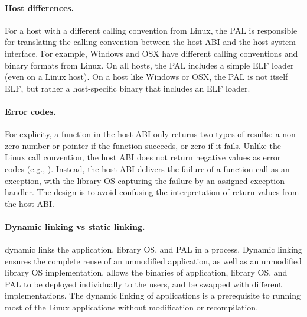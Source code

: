 



\paragraph{Host differences.}
For a host with a different calling convention from Linux,
the PAL is responsible for translating the calling convention between the host ABI and the host system interface.
For example,
Windows and OSX have different calling conventions and binary formats
from Linux.
On all hosts, the PAL includes a simple ELF loader (even on a Linux host).
On a host like Windows or OSX, the PAL is not itself ELF,
but rather a host-specific binary that includes an ELF loader.




\paragraph{Error codes.}
For explicity, a function in the host ABI only returns two types of results:
a non-zero number or pointer if the function succeeds, or zero if it fails.
Unlike the Linux call convention, the host ABI does not return negative values as error codes (e.g., ).
Instead, the host ABI delivers the failure of a function call
as an exception, with the library OS capturing the failure by an assigned exception handler.
The design is to avoid confusing
the interpretation of return values from the host ABI.



\paragraph{Dynamic linking vs static linking.}
\graphene{} dynamic links the application, library OS, and PAL
in a process.
Dynamic linking ensures the complete reuse of an unmodified application,
as well as an unmodified library OS implementation.
\graphene{} allows the binaries of application, library OS, and PAL to be deployed individually to the users,
and be swapped with different implementations.
The dynamic linking of applications is a prerequisite
to running most of the Linux applications without modification or recompilation.



